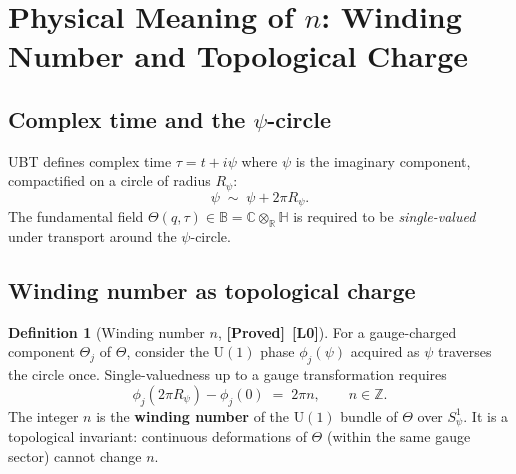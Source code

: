 \documentclass[12pt,a4paper]{article}
\theoremstyle{definition}
\newtheorem{definition}[theorem]{Definition}
\theoremstyle{remark}
\newcommand{\BB}{\mathbb{B}}
\newcommand{\CC}{\mathbb{C}}
\newcommand{\RR}{\mathbb{R}}
\newcommand{\HH}{\mathbb{H}}
\newcommand{\ZZ}{\mathbb{Z}}
\newcommand{\PROVED}{\textbf{[Proved]}}
\newcommand{\Lzero}{\textbf{[L0]}}
\begin{document}
\section{Physical Meaning of $n$: Winding Number and Topological Charge}
\label{sec:psp:n}

\subsection{Complex time and the $\psi$-circle}

UBT defines complex time $\tau = t + i\psi$ where $\psi$ is the imaginary
component, compactified on a circle of radius $R_\psi$:
\begin{equation}
  \psi \;\sim\; \psi + 2\pi R_\psi.
  \label{eq:psp:circle}
\end{equation}
The fundamental field $\Theta(q,\tau) \in \BB = \CC\otimes_\RR\HH$ is required
to be \emph{single-valued} under transport around the $\psi$-circle.

\subsection{Winding number as topological charge}

\begin{definition}[Winding number $n$, \PROVED\ \Lzero]
\label{def:psp:n}
For a gauge-charged component $\Theta_j$ of $\Theta$, consider the $\mathrm{U}(1)$
phase $\phi_j(\psi)$ acquired as $\psi$ traverses the circle once.
Single-valuedness up to a gauge transformation requires
\begin{equation}
  \phi_j(2\pi R_\psi) - \phi_j(0)
  \;=\; 2\pi n,
  \qquad n \in \ZZ.
  \label{eq:psp:wind_def}
\end{equation}
The integer $n$ is the \textbf{winding number} of the $\mathrm{U}(1)$ bundle
of $\Theta$ over $S^1_\psi$.  It is a topological invariant:
continuous deformations of $\Theta$ (within the same gauge sector) cannot change $n$.
\end{definition}
\end{document}

